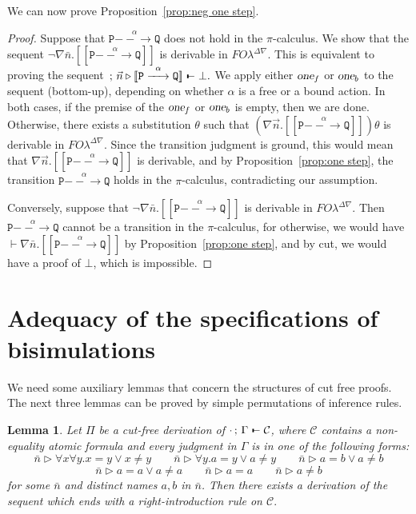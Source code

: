 \documentclass{acmtrans2m}
\newtheorem{lemma}[theorem]{Lemma}
\def\Cscr{{\mathcal C}}
\def\Ppi{{\mathtt P}}
\def\Qpi{{\mathtt Q}}
\def\relbar{\mathrel{\smash-}}
\def\joinrelm{\mathrel{\mkern-3.2mu}}
\def\tailpiece{\kern 1pt\vrule height 1ex width 0.3ex depth -.25ex}
\def\seqsym{\mathrel{\tailpiece\joinrelm\relbar}}
\newcommand{\FOL   }{FO\lambda}
\newcommand{\FOLDNb}{\FOL^{\Delta\nabla}}
\newcommand{\Judg}[2]{#1\triangleright#2}
\newcommand{\NSeq}[3]{#1\,;\,#2 \seqsym #3}
\newcommand{\one  }[3]{#1\stackrel{#2}{-\!\!-\!\!\!\rightarrow    } #3}
\newcommand{\trans}[1]{[\![ #1 ]\!]}
\begin{document}
We can now prove Proposition~\ref{prop:neg one step}.


\begin{proof}
Suppose that $\one{\Ppi}{\alpha}{\Qpi}$ does not hold in the $\pi$-calculus.
We show that the sequent $\neg \nabla \bar n. \trans{\one \Ppi \alpha \Qpi}$ is 
derivable in $\FOLDNb.$ 
This is equivalent to proving the sequent
$
\NSeq{}{\Judg{ \vec n}{ \trans{\one \Ppi \alpha \Qpi}}}{\bot}.
$
We apply either $\hbox{\sl one}_f$ or $\hbox{\sl one}_b$ to the sequent (bottom-up), 
depending on whether $\alpha$ is a free or a bound action. 
In both cases, if the premise of the $\hbox{\sl one}_f$ or $\hbox{\sl one}_b$ is 
empty, then we are done. Otherwise, there exists a substitution
$\theta$ such that $(\nabla \vec n. \trans{\one \Ppi \alpha \Qpi})\theta$
is derivable in $\FOLDNb$. Since the transition judgment is ground, this would
mean that $\nabla \vec n. \trans{\one \Ppi \alpha \Qpi}$ is derivable, and
by Proposition~\ref{prop:one step}, the transition $\one \Ppi \alpha \Qpi$ holds
in the $\pi$-calculus, contradicting our assumption.

Conversely, suppose that $\neg \nabla \bar n. \trans{\one \Ppi \alpha \Qpi}$
is derivable in $\FOLDNb.$ Then $\one \Ppi \alpha \Qpi$ cannot be a transition
in the $\pi$-calculus, for otherwise, we would have $\vdash \nabla \bar n. \trans{\one \Ppi \alpha \Qpi}$
by Proposition~\ref{prop:one step}, and by cut, we would have a proof of $\bot$, which
is impossible. 
\end{proof}



\section{Adequacy of the specifications of bisimulations}

We need some auxiliary lemmas that concern the structures of cut free proofs.
The next three lemmas can be proved by simple permutations of inference rules. 

\begin{lemma}
\label{lm:right-first}
Let $\Pi$ be a cut-free derivation of $\NSeq{\cdot}{\Gamma}{\Cscr}$,  where $\Cscr$ 
contains a non-equality atomic formula and 
every judgment in $\Gamma$ is in one of the following forms:
$$
\Judg{\bar n}{\forall x\forall y. x = y \lor x \not = y}
\qquad
\Judg{\bar n}{\forall y. a = y \lor a \not = y}
\qquad
\Judg{\bar n}{a = b \lor a \not = b}
$$
$$
\Judg{\bar n}{a = a \lor a \not = a}
\qquad
\Judg{\bar n}{a = a}
\qquad
\Judg{\bar n}{a \not = b}
$$
for some $\bar n$ and distinct names $a,b$ in $\bar n$.
Then there exists a derivation of the sequent which ends with a right-introduction rule on $\Cscr.$
\end{lemma}
\end{document}
